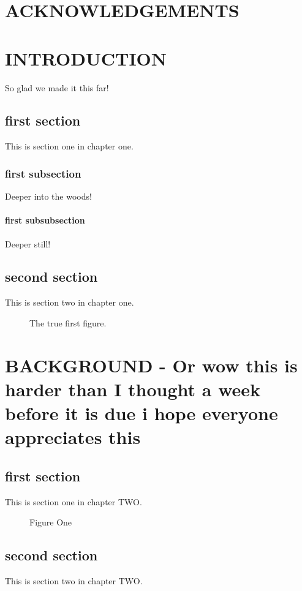 \documentclass[12pt,english]{report}
\begin{document}
\setupTOC


\clearpage
{}

\clearpage
\chapter*{ACKNOWLEDGEMENTS}%

\clearpage

\tableofcontents
\clearpage
\listoffigures
\clearpage
\listoftables


\clearpage

\setupChapters

\chapter{INTRODUCTION}
So glad we made it this far!
\section{first section}
This is section one in chapter one.
\subsection{first subsection}
Deeper into the woods!
\subsubsection{first subsubsection}
Deeper still!
\section{second section }
This is section two  in chapter one.
\begin{figure}
\caption[Figure Zero]{The true first figure.}
\end{figure}

\chapter{BACKGROUND - Or wow this is harder than I thought a week before it is due i hope everyone appreciates this}
\section{first section}
This is section one in chapter TWO.
\begin{figure}
\caption[Figure One]{Figure One}
\end{figure}
\section{second section }
This is section two  in chapter TWO.
\end{document}
